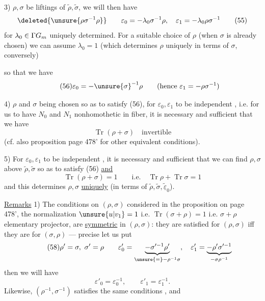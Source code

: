 3)  $\rho,\sigma$ be liftings of
$\widetilde\rho,\widetilde\sigma$, we will then have
\[
  \deleted{\unsure{\rho\sigma^{-1}\rho}}\qquad
  \varepsilon_0=-\lambda_0\sigma^{-1}\rho,\quad
  \varepsilon_1=-\lambda_0\rho\sigma^{-1} \tag{55}
\]
for $\lambda_0\in\Gamma\mathbb \mathbb G_m$ uniquely determined.
For a suitable choice of $\rho$ (when $\sigma$ is already chosen)
we can assume $\lambda_0=1$
(which determines $\rho$ uniquely in
 terms of $\sigma$,  conversely)



 so that we have
\[
\tag{56}
\varepsilon_0=-\unsure{\sigma}^{-1}\rho
\qquad(\text{hence }\varepsilon_1=-\rho\sigma^{-1})
\]

4) $\rho$ and $\sigma$ being chosen so as to satisfy (56), for $\varepsilon_0,\varepsilon_1$ to be  independent , i.e. for us to have $N_0$ and $N_1$ nonhomothetic in  fiber, it is necessary and sufficient that we have
\[
\tag{57}
\operatorname{Tr}(\rho+\sigma)\quad\text{invertible}
\]
(cf. also proposition page 478' for other equivalent conditions).

5) For $\varepsilon_0,\varepsilon_1$ to be independent , it is necessary and sufficient that we  can find  $\rho,\sigma$ above $\widetilde\rho,\widetilde\sigma$ so as to satisfy (56) \uline{and}
\[
\tag{57'}
\operatorname{Tr}(\rho+\sigma)=1
\qquad\text{i.e.}\quad
\operatorname{Tr}\rho+\operatorname{Tr}\sigma=1
\]
and this determines $\rho,\sigma$ \uline{uniquely} (in terms of $\widetilde\rho,\widetilde\sigma,\underline{\widetilde\varepsilon}_0$).

\uline{Remarks} 1) The conditions on $(\rho,\sigma)$ considered in the proposition on page 478',  the normalization $\unsure{u|v_1}=1$ i.e. $\operatorname{Tr}(\sigma+\rho)=1$ i.e. $\sigma+\rho$ elementary projector, are \uline{symmetric} in $(\rho,\sigma)$: they are satisfied for $(\rho,\sigma)$ iff they are for $(\sigma,\rho)$ ---   precise let us put
\[
\tag{58}
\rho'=\sigma,\ \sigma'=\rho\qquad
\varepsilon'_0=\underbrace{-\sigma'^{-1}\rho'}_{\unsure{=}-\rho^{-1}\sigma},\quad
\varepsilon'_1=\underbrace{-\rho'\sigma'^{-1}}_{-\sigma\rho^{-1}}
\]
then we will have
\[
\tag{59}
\varepsilon'_0=\varepsilon_0^{-1},\qquad
\varepsilon'_1=\varepsilon_1^{-1}.
\]
Likewise, $(\rho^{-1},\sigma^{-1})$ satisfies the same conditions , and 

